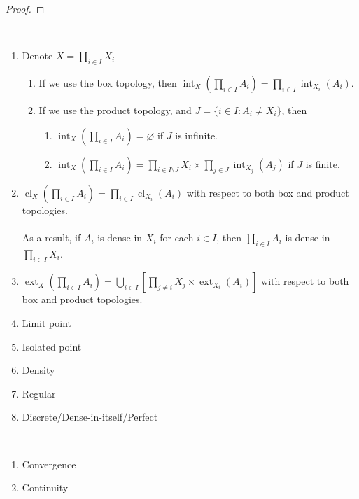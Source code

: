 \documentclass{treatise}
\begin{document}
\begin{shaded}
\begin{proof}
\end{proof}
\begin{proposition} \ 
\begin{enumerate}
    \item Denote $X = \prod_{i \in I} X_i$
    \begin{enumerate}
        \item If we use the box topology, then $\operatorname{int}_X \left( \prod_{i \in I} A_i \right) = \prod_{i \in I} \operatorname{int}_{X_i} (A_i)$.
        \item If we use the product topology, and $J = \{ i \in I : A_i \neq X_i \}$, then
        \begin{enumerate}
            \item $\operatorname{int}_X \left( \prod_{i \in I} A_i \right) = \varnothing$ if $J$ is infinite.
            \item $\operatorname{int}_X \left( \prod_{i \in I} A_i \right) = \prod_{i \in I \setminus J} X_i \times \prod_{j \in J} \operatorname{int}_{X_j} (A_j)$ if $J$ is finite.
        \end{enumerate}
    \end{enumerate}
    \item $\operatorname{cl}_X \left( \prod_{i \in I} A_i \right) = \prod_{i \in I} \operatorname{cl}_{X_i} (A_i)$ with respect to both box and product topologies.
    \\
    \\
    As a result, if $A_i$ is dense in $X_i$ for each $i \in I$, then $\prod_{i \in I} A_i$ is dense in $\prod_{i \in I} X_i$.
    \item $\operatorname{ext}_X \left( \prod_{i \in I} A_i \right) = \bigcup_{i \in I} \left[ \prod_{j \neq i} X_j \times \operatorname{ext}_{X_i} (A_i) \right]$ with respect to both box and product topologies.
    \item Limit point
    \item Isolated point
    \item Density
    \item Regular
    \item Discrete/Dense-in-itself/Perfect
\end{enumerate}
\end{proposition}
\begin{proposition} \ 
\begin{enumerate}
    \item Convergence
    \item Continuity

\end{enumerate}
\end{proposition}
\end{shaded}
\end{document}
